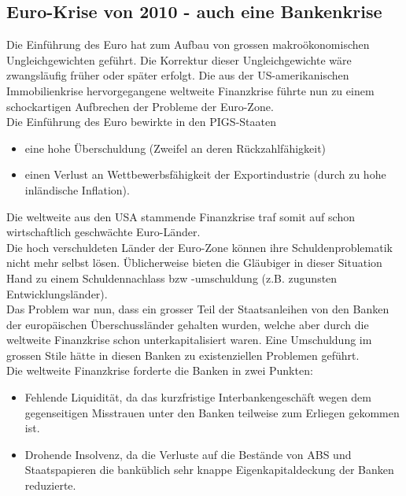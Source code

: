 \subsection{Euro-Krise von 2010 - auch eine Bankenkrise}
Die Einführung des Euro hat zum Aufbau von grossen makroökonomischen Ungleichgewichten geführt. Die Korrektur dieser Ungleichgewichte wäre zwangsläufig früher oder später erfolgt. Die aus der US-amerikanischen Immobilienkrise hervorgegangene weltweite Finanzkrise führte nun zu einem schockartigen Aufbrechen der Probleme der Euro-Zone.\\
Die Einführung des Euro bewirkte in den PIGS-Staaten
\begin{itemize}
	\item eine hohe Überschuldung (Zweifel an deren Rückzahlfähigkeit)
	\item einen Verlust an Wettbewerbsfähigkeit der Exportindustrie (durch zu hohe inländische Inflation).
\end{itemize}
Die weltweite aus den USA stammende Finanzkrise traf somit auf schon wirtschaftlich geschwächte Euro-Länder.\\
Die hoch verschuldeten Länder der Euro-Zone können ihre Schuldenproblematik nicht mehr selbst lösen. Üblicherweise bieten die Gläubiger in dieser Situation Hand zu einem Schuldennachlass bzw -umschuldung (z.B. zugunsten Entwicklungsländer).\\
Das Problem war nun, dass ein grosser Teil der Staatsanleihen von den Banken der europäischen Überschussländer gehalten wurden, welche aber durch die weltweite Finanzkrise schon unterkapitalisiert waren. Eine Umschuldung im grossen Stile hätte in diesen Banken zu existenziellen Problemen geführt.\\
Die weltweite Finanzkrise forderte die Banken in zwei Punkten:
\begin{itemize}
	\item Fehlende Liquidität, da das kurzfristige Interbankengeschäft wegen dem gegenseitigen Misstrauen unter den Banken teilweise zum Erliegen gekommen ist.
	\item Drohende Insolvenz, da die Verluste auf die Bestände von ABS und Staatspapieren die banküblich sehr knappe Eigenkapitaldeckung der Banken reduzierte.
\end{itemize}

